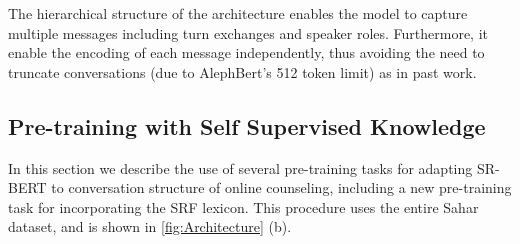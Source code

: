 \documentclass[letterpaper]{article} %
\newcommand{\kibitz}[2]{\ifnum\Comments=1{\textcolor{#1}{#2}}\fi}
\newcommand{\kg}[1]{\kibitz{red}{[KG:#1]}}
\newcommand{\di}[1]{\kibitz{blue}{[DI:#1]}}
\begin{document}
The hierarchical structure of the architecture enables the model to capture multiple messages including turn exchanges and speaker roles. Furthermore, it enable the encoding of each message independently, thus avoiding the need to truncate conversations (due to  AlephBert's 512 token limit) as in past work.




\subsection{Pre-training with  Self Supervised Knowledge}
In this section we describe the use of several pre-training tasks for adapting SR-BERT to conversation structure of online counseling, including a  new pre-training task for   incorporating the SRF lexicon. This procedure uses the entire Sahar dataset, and is shown in \autoref{fig:Architecture} (b).
\end{document}

